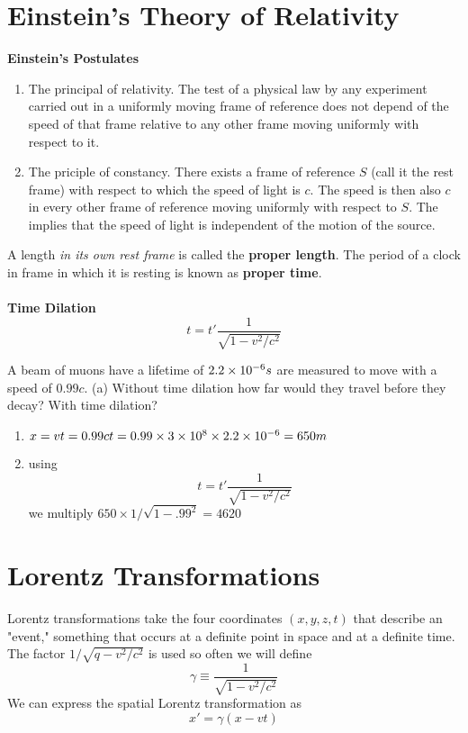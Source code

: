 \section{Einstein's Theory of Relativity}
\textbf{Einstein's Postulates}
\begin{enumerate}
	\item The principal of relativity. The test of a physical law by any experiment carried out in a uniformly moving frame of reference does not depend of the speed of that frame relative to any other frame moving uniformly with respect to it. 
	\item The priciple of constancy. There exists a frame of reference $ S $ (call it the rest frame) with respect to which the speed of light is $ c $. The speed is then also $ c $ in every other frame of reference moving uniformly with respect to $ S $. The implies that the speed of light is independent of the motion of the source. 
\end{enumerate} 
A length \textit{in its own rest frame} is called the \textbf{proper length}. The period of a clock in frame in which it is resting is known as \textbf{proper time}. \\ \\
\textbf{Time Dilation}
\[ t = t' \dfrac{1}{\sqrt{1 - v^2 / c^2}}  \]
\begin{example}
	A beam of muons have a lifetime of $ 2.2 \times 10^{-6} s$ are measured to move with a speed of $ 0.99 c $. (a) Without time dilation how far would they travel before they decay? With time dilation?
	
	\begin{enumerate}
		\item  $ x = vt = 0.99ct= 0.99 \times 3	 \times 10^{8} \times 2.2 \times 10^{-6} = 650m $
		\item  using \[ t = t' \dfrac{1}{\sqrt{1-v^2/c^2}} \] we multiply $ 650 \times 1/\sqrt{1-.99^2} = 4620 $ 
	\end{enumerate}
\end{example}
\section{Lorentz Transformations}
Lorentz transformations take the four coordinates $ (x,y,z,t) $ that describe an "event," something that occurs at a definite point in space and at a definite time. \\ 
The factor $ 1/\sqrt{q - v^2 /c^2} $ is used so often we will define
\[ \gamma  \equiv \dfrac{1}{\sqrt{1-v^2/c^2}} \]
We can express the spatial Lorentz transformation as
\[ x' = \gamma (x-vt) \]
